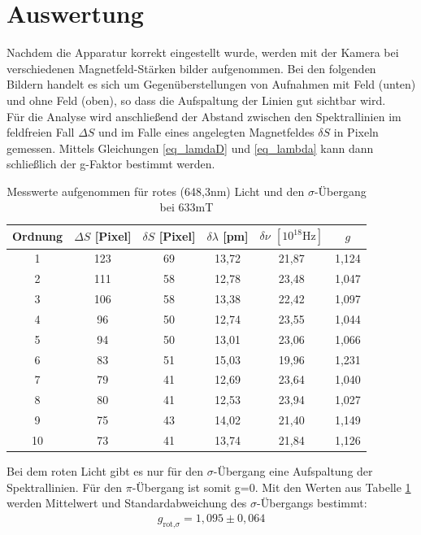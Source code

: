 \section{Auswertung}
Nachdem die Apparatur korrekt eingestellt wurde, werden mit der Kamera bei verschiedenen Magnetfeld-Stärken bilder aufgenommen. Bei den folgenden Bildern handelt es sich um Gegenüberstellungen von Aufnahmen mit Feld (unten) und ohne Feld (oben), so dass die Aufspaltung der Linien gut sichtbar wird.\\
Für die Analyse wird anschließend der Abstand zwischen den Spektrallinien im feldfreien Fall $\Delta S$ und im Falle eines angelegten Magnetfeldes $\delta S$ in Pixeln gemessen. Mittels Gleichungen \eqref{eq_lamdaD} und \eqref{eq_lambda} kann dann schließlich der g-Faktor bestimmt werden.
\begin{table}[htbp]
    \begin{tabular}{|c|c|c|c|c|c|}
        Ordnung & $\Delta S$ [Pixel]    & $\delta S$ [Pixel]    &$\delta \lambda$ [pm]  & $\delta \nu$ $[10^{18}\text{Hz}]$ &   $g$\\\hline
        1&  123&    69& 13,72&  21,87&  1,124\\\hline
        2&  111&    58& 12,78&  23,48&  1,047\\\hline
        3&  106&    58& 13,38&  22,42&  1,097\\\hline
        4&  96&     50& 12,74&  23,55&  1,044\\\hline
        5&  94&     50& 13,01&  23,06&  1,066\\\hline
        6&  83&     51& 15,03&  19,96&  1,231\\\hline
        7&  79&     41& 12,69&  23,64&  1,040\\\hline
        8&  80&     41& 12,53&  23,94&  1,027\\\hline
        9&  75&     43& 14,02&  21,40&  1,149\\\hline
        10& 73&     41& 13,74&  21,84&  1,126\\\hline
    \end{tabular}
    \caption{Messwerte aufgenommen für rotes (648,3nm) Licht und den $\sigma$-Übergang bei 633mT}
    \label{tab_red_sigma}
\end{table}

Bei dem roten Licht gibt es nur für den $\sigma$-Übergang eine Aufspaltung der Spektrallinien. Für den $\pi$-Übergang ist somit g=0. Mit den Werten aus Tabelle \ref{tab_red_sigma} werden Mittelwert und Standardabweichung des $\sigma$-Übergangs bestimmt:
\begin{align*}
g_{\text{rot,}\sigma}=1,095\pm0,064
\end{align*}

